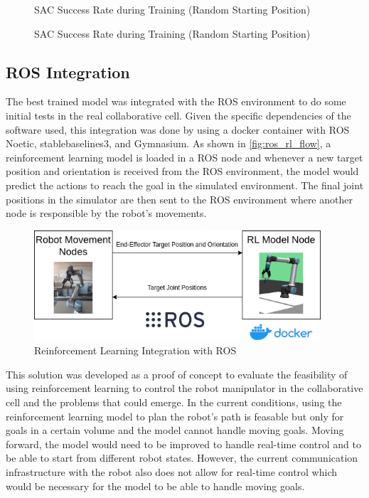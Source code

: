 \begin{figure}[H]%
    \centering
    {\fontsize{8}{11}\selectfont}
    \caption{SAC Success Rate during Training (Random Starting Position)}
    \label{fig:reward_rp}
\end{figure}

\begin{figure}[H]%
    \centering
    {\fontsize{8}{11}\selectfont}
    \caption{SAC Success Rate during Training (Random Starting Position)}
    \label{fig:success_rate_rp}
\end{figure}

\subsection{ROS Integration}

The best trained model was integrated with the ROS environment to do some initial tests in the real collaborative cell. Given the specific dependencies of the software used, this integration was done by using a docker container with ROS Noetic, stablebaselines3, and Gymnasium. As shown in \autoref{fig:ros_rl_flow}, a reinforcement learning model is loaded in a ROS node and whenever a new target position and orientation is received from the ROS environment, the model would predict the actions to reach the goal in the simulated environment. The final joint positions in the simulator are then sent to the ROS environment where another node is responsible by the robot's movements.

\begin{figure}[ht]
    \centerline{\includegraphics[width=0.95\textwidth]{figs/ros_rl_flow.png}}
    \caption{Reinforcement Learning Integration with ROS}
    \label{fig:ros_rl_flow}
\end{figure}

This solution was developed as a proof of concept to evaluate the feasibility of using reinforcement learning to control the robot manipulator in the collaborative cell and the problems that could emerge. In the current conditions, using the reinforcement learning model to plan the robot's path is feasable but only for goals in a certain volume and the model cannot handle moving goals. Moving forward, the model would need to be improved to handle real-time control and to be able to start from different robot states. However, the current communication infrastructure with the robot also does not allow for real-time control which would be necessary for the model to be able to handle moving goals.
